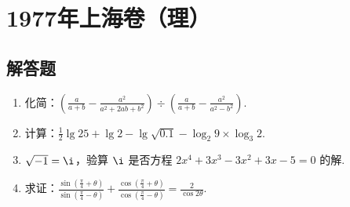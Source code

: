 \chapter{1977年上海卷（理）}

\section{解答题}

\begin{problem}
\begin{enumerate}
\item 化简：\(\left(\frac{a}{a+b}-\frac{a^2}{a^2+2ab+b^2}\right)\div\left(\frac{a}{a+b}-\frac{a^2}{a^2-b^2}\right)\).

\item 计算：\(\frac{1}{2}\lg 25+\lg 2-\lg \sqrt{0.1}-\log_2 9\times\log_3 2\).

\item \(\sqrt{-1}=\i\)，验算 \(\i\) 是否方程 \(2x^4+3x^3-3x^2+3x-5=0\) 的解.

\item 求证：\(\frac{\sin\left(\frac{\pi}{4}+\theta\right)}{\sin\left(\frac{\pi}{4}-\theta\right)}+\frac{\cos\left(\frac{\pi}{4}+\theta\right)}{\cos\left(\frac{\pi}{4}-\theta\right)}=\frac{2}{\cos 2\theta}\).

\end{enumerate}
\end{problem}

